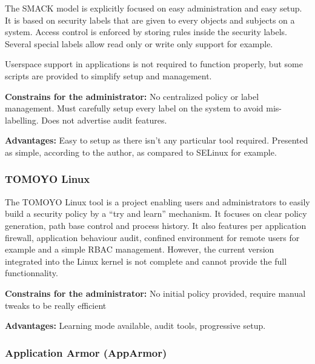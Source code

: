 \documentclass[pdftex,a4paper,titlepage,11pt]{article}
\begin{document}
The SMACK model \cite{schaufler2008simplified} is explicitly focused on easy
administration and easy setup. It is based on security labels that are given to
every objects and subjects on a system. Access control is enforced by storing
rules inside the security labels. Several special labels allow read only or
write only support for example. 

Userspace support in applications is not required to function properly, but
some scripts are provided to simplify setup and management.

\begin{list}{}{}
 \item \textbf{Constrains for the administrator:} No centralized policy or
label management. Must carefully setup every label on the system to avoid
mis-labelling. Does not advertise audit features.
 \item \textbf{Advantages:} Easy to setup as there isn't any particular tool
required. Presented as simple, according to the author, as compared to SELinux
for example.
\end{list}

\subsubsection{TOMOYO Linux}

The TOMOYO Linux tool \cite{tanaka2003access} \cite{harada2004task}
\cite{harada2005towards} is a project enabling users and administrators to
easily build a security policy by a ``try and learn'' mechanism. It focuses on
clear policy generation, path base control and process history. It also
features per application firewall, application behaviour audit, confined
environment for remote users for example and a simple RBAC management. However,
the current version integrated into the Linux kernel is not complete and cannot
provide the full functionnality.

\begin{list}{}{}
 \item \textbf{Constrains for the administrator:} No initial policy
provided, require manual tweaks to be really efficient
 \item \textbf{Advantages:} Learning mode available, audit tools, progressive
setup.
\end{list}

\subsubsection{Application Armor (AppArmor)}
\end{document}

